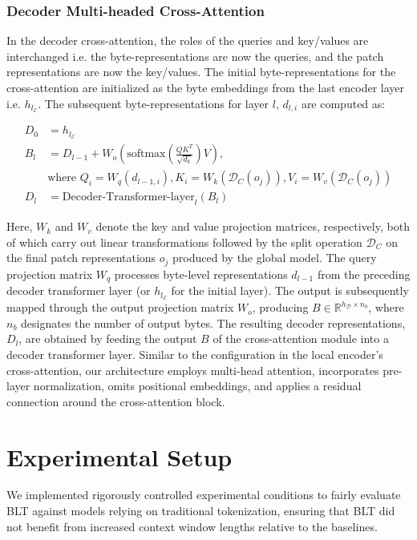 \subsubsection{Decoder Multi-headed Cross-Attention} 

In the decoder cross-attention, the roles of the queries and key/values are interchanged i.e. the byte-representations are now the queries, and the patch representations are now the key/values. The initial byte-representations for the cross-attention are initialized as the byte embeddings from the last encoder layer i.e. $h_{l_{\mathcal{E}}}$. The subsequent byte-representations for layer $l$, $d_{l,i}$ are computed as:

\begin{align}
D_0 &= h_{l_{\mathcal{E}}} \\
B_l &= D_{l-1} + W_o\left(\text{softmax}\left(\frac{QK^T}{\sqrt{d_k}}\right)V\right), \\
  &\text{where } Q_i = W_q(d_{l-1,i}), K_i = W_k(\mathcal{D}_C(o_j)), V_i = W_v(\mathcal{D}_C(o_j)) \\
  D_l &= \text{Decoder-Transformer-layer}_l(B_l)
\end{align}

Here, $W_k$ and $W_v$ denote the key and value projection matrices, respectively, both of which carry out linear transformations followed by the split operation $\mathcal{D}_C$ on the final patch representations $o_j$ produced by the global model. The query projection matrix $W_q$ processes byte-level representations $d_{l-1}$ from the preceding decoder transformer layer (or $h_{l_{\mathcal{E}}}$ for the initial layer). The output is subsequently mapped through the output projection matrix $W_o$, producing $B \in \mathbb{R}^{h_{\mathcal{D}} \times n_b}$, where $n_b$ designates the number of output bytes. The resulting decoder representations, $D_l$, are obtained by feeding the output $B$ of the cross-attention module into a decoder transformer layer. Similar to the configuration in the local encoder’s cross-attention, our architecture employs multi-head attention, incorporates pre-layer normalization, omits positional embeddings, and applies a residual connection around the cross-attention block.

\section{Experimental Setup}
\label{section:experiments}
We implemented rigorously controlled experimental conditions to fairly evaluate {\textsc BLT} against models relying on traditional tokenization, ensuring that {\textsc BLT} did not benefit from increased context window lengths relative to the baselines.

